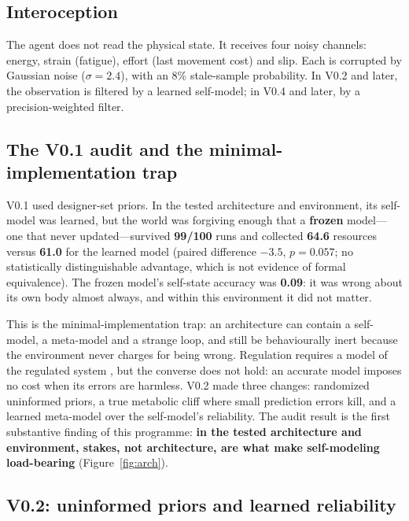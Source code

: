 \documentclass{article}
\begin{document}
\subsection{Interoception}

The agent does not read the physical state. It receives four noisy channels: energy, strain (fatigue), effort (last movement cost) and slip. Each is corrupted by Gaussian noise ($\sigma=2.4$), with an 8\% stale-sample probability. In V0.2 and later, the observation is filtered by a learned self-model; in V0.4 and later, by a precision-weighted filter.

\subsection{The V0.1 audit and the minimal-implementation trap}

V0.1 used designer-set priors. In the tested architecture and environment, its self-model was learned, but the world was forgiving enough that a \textbf{frozen} model---one that never updated---survived \textbf{99/100} runs and collected \textbf{64.6} resources versus \textbf{61.0} for the learned model (paired difference $-3.5$, $p=0.057$; no statistically distinguishable advantage, which is not evidence of formal equivalence). The frozen model's self-state accuracy was \textbf{0.09}: it was wrong about its own body almost always, and within this environment it did not matter.

This is the minimal-implementation trap: an architecture can contain a self-model, a meta-model and a strange loop, and still be behaviourally inert because the environment never charges for being wrong. Regulation requires a model of the regulated system \citep{conant1970every}, but the converse does not hold: an accurate model imposes no cost when its errors are harmless. V0.2 made three changes: randomized uninformed priors, a true metabolic cliff where small prediction errors kill, and a learned meta-model over the self-model's reliability. The audit result is the first substantive finding of this programme: \textbf{in the tested architecture and environment, stakes, not architecture, are what make self-modeling load-bearing} (Figure~\ref{fig:arch}).

\subsection{V0.2: uninformed priors and learned reliability}
\end{document}
